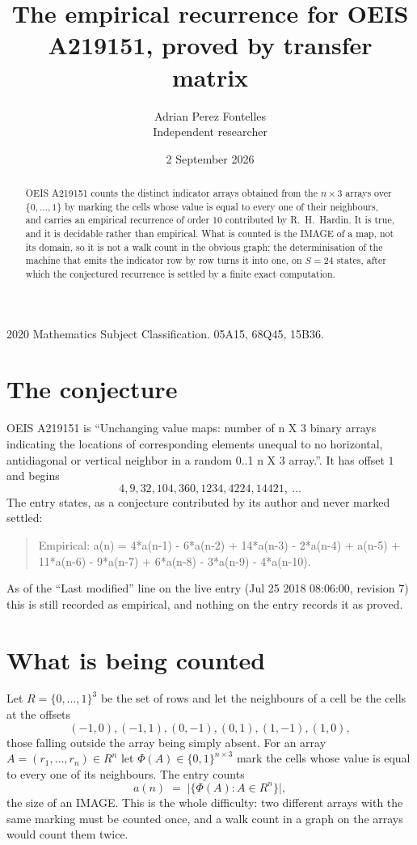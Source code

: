 \documentclass[11pt,a4paper]{article}
\title{The empirical recurrence for OEIS A219151, proved by transfer matrix}
\author{Adrian Perez Fontelles\\ \small Independent researcher}
\date{2 September 2026}
\theoremstyle{plain}
\theoremstyle{definition}
\begin{document}
\maketitle

\begin{abstract}
OEIS A219151 counts the distinct indicator arrays obtained from the $n\times3$ arrays over
$\{0,\dots,1\}$ by marking the cells whose value is equal to every one of their neighbours, and carries an
empirical recurrence of order $10$ contributed by R.~H.~Hardin. It is true, and it is
decidable rather than empirical. What is counted is the IMAGE of a map, not its domain, so it
is not a walk count in the obvious graph; the determinisation of the machine that emits the
indicator row by row turns it into one, on $S=24$ states, after which the conjectured
recurrence is settled by a finite exact computation.
\end{abstract}

\noindent\small 2020 Mathematics Subject Classification. 05A15, 68Q45, 15B36.\normalsize

\section{The conjecture}

OEIS A219151 is ``Unchanging value maps: number of n X 3 binary arrays indicating the locations of corresponding elements unequal to no horizontal, antidiagonal or vertical neighbor in a random 0..1 n X 3 array.''. It has offset $1$ and begins
\[
4, 9, 32, 104, 360, 1234, 4224, 14421,\ \dots
\]
The entry states, as a conjecture contributed by its author and never marked settled:
\begin{quote}
Empirical: a(n) = 4*a(n-1) - 6*a(n-2) + 14*a(n-3) - 2*a(n-4) + a(n-5) + 11*a(n-6) - 9*a(n-7) + 6*a(n-8) - 3*a(n-9) - 4*a(n-10).
\end{quote}
As of the ``Last modified'' line on the live entry (Jul 25 2018 08:06:00, revision 7) this is still
recorded as empirical, and nothing on the entry records it as proved.

\section{What is being counted}

Let $R=\{0,\dots,1\}^{3}$ be the set of rows and let the neighbours of a cell be the
cells at the offsets
\[
(-1,0), (-1,1), (0,-1), (0,1), (1,-1), (1,0),
\]
those falling outside the array being simply absent. For an array
$A=(r_1,\dots,r_n)\in R^n$ let $\Phi(A)\in\{0,1\}^{n\times3}$ mark the cells whose value
is equal to every one of its neighbours. The entry counts
\[
a(n)\;=\;\bigl|\{\Phi(A):A\in R^n\}\bigr| ,
\]
the size of an IMAGE. This is the whole difficulty: two different arrays with the same marking
must be counted once, and a walk count in a graph on the arrays would count them twice.
\end{document}
